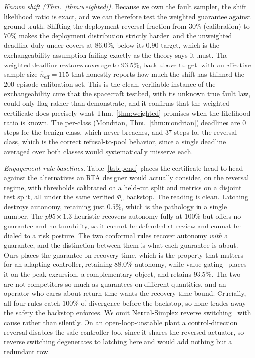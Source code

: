\documentclass[11pt]{article}
\theoremstyle{plain}
\theoremstyle{definition}
\begin{document}
\emph{Known shift (Thm.~\ref{thm:weighted}).} Because we own the fault sampler, the shift
likelihood ratio is exact, and we can therefore test the weighted guarantee against ground
truth. Shifting the deployment reversal fraction from $30\%$
(calibration) to $70\%$ makes the deployment distribution strictly harder, and the unweighted
deadline duly under-covers at $86.0\%$, below its $0.90$ target, which is the exchangeability
assumption failing exactly as the theory says it must. The weighted deadline restores coverage
to $93.5\%$, back above target, with an effective sample size
$\widehat{n}_{\mathrm{eff}}=115$ that honestly reports how much the shift has thinned the
$200$-episode calibration set. This is the clean, verifiable instance of the exchangeability
cure that the spacecraft testbed, with its unknown true fault law, could only flag rather than
demonstrate, and it confirms that the weighted certificate does precisely what
Thm.~\ref{thm:weighted} promises when the likelihood ratio is known. The per-class (Mondrian,
Thm.~\ref{thm:mondrian}) deadlines are $0$ steps for the benign class, which never breaches,
and $37$ steps for the reversal class, which is the correct refusal-to-pool behavior, since a
single deadline averaged over both classes would systematically misserve each.

\emph{Engagement-rule baselines.} Table~\ref{tab:pend} places the certificate head-to-head
against the alternatives an RTA designer would actually consider, on the reversal regime, with
thresholds calibrated on a held-out split and metrics on a disjoint test split, all under the
same verified $\Phi_c$ backstop. The reading is clean. Latching destroys autonomy, retaining
just $0.5\%$, which is the pathology in a single number. The $p95\times1.3$ heuristic recovers
autonomy fully at $100\%$ but offers no guarantee and no tunability, so it cannot be defended
at review and cannot be dialed to a risk posture. The two conformal rules recover autonomy
\emph{with} a guarantee, and the distinction between them is what each guarantee is about.
Ours places the guarantee on recovery time, which is the property that matters for an adapting
controller, retaining $88.0\%$ autonomy, while value-gating~\cite{Tabbara2025} places it on
the peak excursion, a complementary object, and retains $93.5\%$. The two are not competitors
so much as guarantees on different quantities, and an operator who cares about return-time
wants the recovery-time bound. Crucially, all four rules catch $100\%$ of divergence before
the backstop, so none trades away the safety the backstop enforces. We omit Neural-Simplex
reverse switching~\cite{Phan2020} with cause rather than silently. On an open-loop-unstable
plant a control-direction reversal disables the safe controller too, since it shares the
reversed actuator, so reverse switching degenerates to latching here and would add nothing but
a redundant row.
\end{document}

